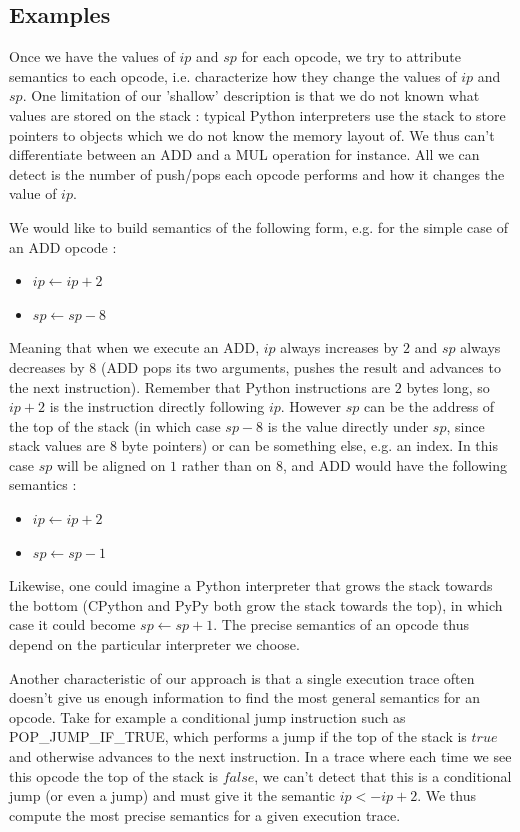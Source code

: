 \documentclass[english]{article}
\begin{document}
\subsection{Examples}

Once we have the values of $ip$ and $sp$ for each opcode, we try to attribute semantics to each opcode, i.e. characterize how they change the values of $ip$ and $sp$. One limitation of our 'shallow' description is that we do not known what values are stored on the stack : typical Python interpreters use the stack to store pointers to objects which we do not know the memory layout of. We thus can't differentiate between an ADD and a MUL operation for instance. All we can detect is the number of push/pops each opcode performs and how it changes the value of $ip$.

We would like to build semantics of the following form, e.g. for the simple case of an ADD opcode :
\begin{itemize}
	\item $ip \leftarrow ip + 2$
	\item $sp \leftarrow sp - 8$
\end{itemize}
Meaning that when we execute an ADD, $ip$ always increases by $2$ and $sp$ always decreases by $8$ (ADD pops its two arguments, pushes the result and advances to the next instruction). Remember that Python instructions are $2$ bytes long, so $ip + 2$ is the instruction directly following $ip$. However $sp$ can be the address of the top of the stack (in which case $sp - 8$ is the value directly under $sp$, since stack values are $8$ byte pointers) or can be something else, e.g. an index. In this case $sp$ will be aligned on $1$ rather than on $8$, and ADD would have the following semantics :
\begin{itemize}
	\item $ip \leftarrow ip + 2$
	\item $sp \leftarrow sp - 1$
\end{itemize}
Likewise, one could imagine a Python interpreter that grows the stack towards the bottom (CPython and PyPy both grow the stack towards the top), in which case it could become $sp \leftarrow sp + 1$. The precise semantics of an opcode thus depend on the particular interpreter we choose.

Another characteristic of our approach is that a single execution trace often doesn't give us enough information to find the most general semantics for an opcode. Take for example a conditional jump instruction such as POP\_JUMP\_IF\_TRUE, which performs a jump if the top of the stack is $true$ and otherwise advances to the next instruction. In a trace where each time we see this opcode the top of the stack is $false$, we can't detect that this is a conditional jump (or even a jump) and must give it the semantic $ip <- ip + 2$. We thus compute the most precise semantics for a given execution trace. 
\end{document}

